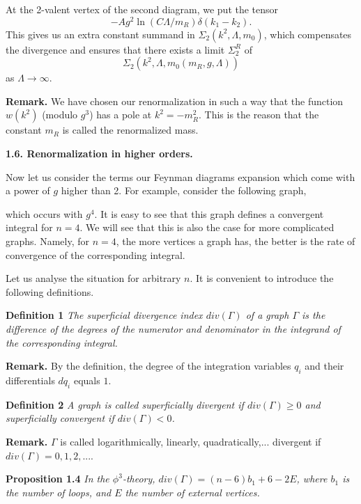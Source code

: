\documentclass[11pt]{article}
\def\proclaim#1{{\bf #1} \it}
\def\endproclaim{\normalfont}
\def\L{\Lambda}
\begin{document}
At the 2-valent vertex of the second diagram, we put 
the tensor \[ -Ag^2\ln(C\L/m_R)\delta(k_1-k_2).\] 
This gives us an extra constant
summand in $\Sigma_2(k^2,\L,m_0)$, which compensates 
the divergence and ensures that there exists a limit 
$\Sigma_2^R$ of \[ \Sigma_2(k^2,\L,m_0(m_R,g,\L))\] as $\L\to\infty$. 
  
{\bf Remark.} We have chosen our renormalization in such a way that
the function $w(k^2)$ (modulo $g^3$) has a pole at $k^2=-m_R^2$. 
This is the reason that the constant $m_R$ is called the renormalized mass.  

{\bf 1.6. Renormalization in higher orders.}

Now let us consider the terms our Feynman diagrams expansion which 
come with a power of $g$ higher than 2. For example, consider the 
following graph,


\begin{center} 
 


\end{center}



\noindent
which occurs with $g^4$. It is easy to see that this graph defines a 
convergent integral for $n=4$. 
We will see that this is also the case for more complicated 
graphs. Namely, for $n=4$, the more vertices a graph has, the 
better is the rate of convergence of the corresponding integral.

Let us analyse the situation for arbitrary $n$. It is convenient 
to introduce the following definitions.

\proclaim{Definition 1} The superficial divergence index $div(\Gamma)$ 
of a graph $\Gamma$
is the difference of the degrees of the numerator and denominator
in the integrand of the corresponding integral. 
\endproclaim

{\bf Remark.} By the definition, the degree of the integration
variables $q_i$ and their differentials $dq_i$ equals $1$.  

\proclaim{Definition 2} A graph is called superficially divergent
if $div(\Gamma)\ge 0$ and superficially convergent if $div(\Gamma)<0$.
\endproclaim

{\bf Remark.} $\Gamma$ is called logarithmically, linearly, quadratically,...
divergent if $div(\Gamma)=0,1,2,...$.

\proclaim{Proposition 1.4} In the $\phi^3$-theory, 
$div(\Gamma)=(n-6)b_1+6-2E$, where $b_1$ is the number of 
loops, and $E$ the number of external vertices.
\endproclaim
\end{document}
